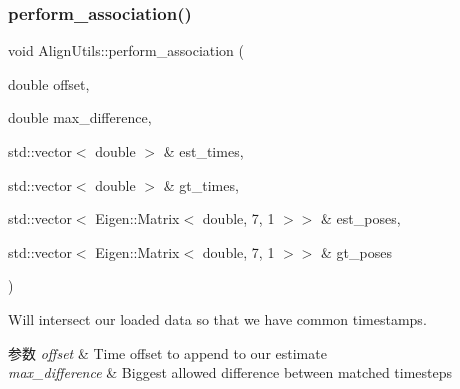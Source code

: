 \subsubsection{\texorpdfstring{perform\+\_\+association()}{perform\_association()}\hspace{0.1cm}{\footnotesize\ttfamily [1/2]}}
{\footnotesize\ttfamily void Align\+Utils\+::perform\+\_\+association (\begin{DoxyParamCaption}\item[{double}]{offset,  }\item[{double}]{max\+\_\+difference,  }\item[{std\+::vector$<$ double $>$ \&}]{est\+\_\+times,  }\item[{std\+::vector$<$ double $>$ \&}]{gt\+\_\+times,  }\item[{std\+::vector$<$ Eigen\+::\+Matrix$<$ double, 7, 1 $>$$>$ \&}]{est\+\_\+poses,  }\item[{std\+::vector$<$ Eigen\+::\+Matrix$<$ double, 7, 1 $>$$>$ \&}]{gt\+\_\+poses }\end{DoxyParamCaption})\hspace{0.3cm}{\ttfamily [static]}}



Will intersect our loaded data so that we have common timestamps. 


\begin{DoxyParams}{参数}
{\em offset} & Time offset to append to our estimate \\
\hline
{\em max\+\_\+difference} & Biggest allowed difference between matched timesteps \\
\hline
\end{DoxyParams}
\mbox{\label{classov__eval_1_1AlignUtils_afd79761c342430237a1ecf563d5c0d05}} 
